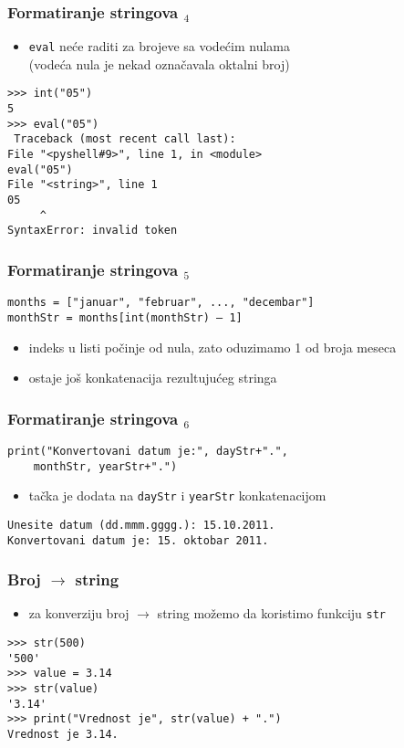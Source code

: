 \documentclass[utf8,compress,aspectratio=169]{beamer}
\begin{document}
\begin{frame}[fragile]
  \frametitle{Formatiranje stringova $_4$}
  \begin{itemize}
    \item \texttt{eval} neće raditi za brojeve sa vodećim nulama\\ (vodeća nula je nekad označavala oktalni broj)
  \end{itemize}
\begin{verbatim}
>>> int("05")
5
>>> eval("05")
 Traceback (most recent call last):
File "<pyshell#9>", line 1, in <module>
eval("05")
File "<string>", line 1
05
     ^
SyntaxError: invalid token
\end{verbatim}
\end{frame}

\begin{frame}[fragile]
  \frametitle{Formatiranje stringova $_5$}
\begin{verbatim}
months = ["januar", "februar", ..., "decembar"]
monthStr = months[int(monthStr) – 1]
\end{verbatim}
  \begin{itemize}
    \item indeks u listi počinje od nula, zato oduzimamo 1 od broja meseca
    \item ostaje još konkatenacija rezultujućeg stringa
  \end{itemize}
\end{frame}

\begin{frame}[fragile]
  \frametitle{Formatiranje stringova $_6$}
\begin{verbatim}
print("Konvertovani datum je:", dayStr+".",
    monthStr, yearStr+".")
\end{verbatim}
  \begin{itemize}
    \item tačka je dodata na \texttt{dayStr} i \texttt{yearStr} konkatenacijom
  \end{itemize}
\begin{verbatim}
Unesite datum (dd.mmm.gggg.): 15.10.2011.
Konvertovani datum je: 15. oktobar 2011.
\end{verbatim}
\end{frame}

\begin{frame}[fragile]
  \frametitle{Broj $\rightarrow$ string}
  \begin{itemize}
    \item za konverziju broj $\rightarrow$ string možemo da koristimo funkciju \texttt{str}
  \end{itemize}
\begin{verbatim}
>>> str(500)
'500'
>>> value = 3.14
>>> str(value)
'3.14'
>>> print("Vrednost je", str(value) + ".")
Vrednost je 3.14.
\end{verbatim}
\end{frame}
\end{document}
